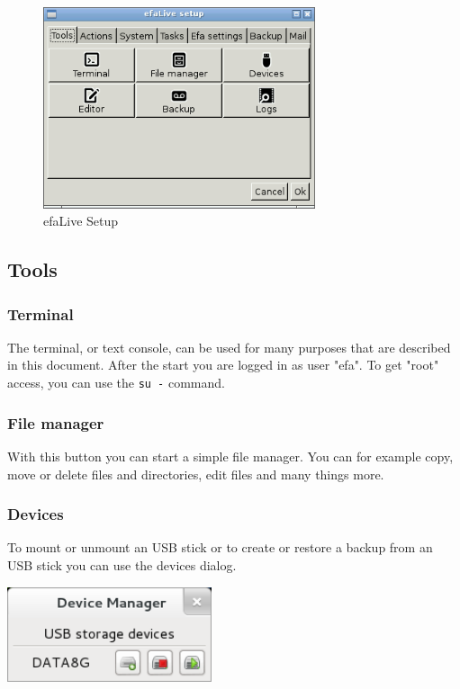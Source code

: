 \documentclass[a4paper,12pt,twoside]{article}
\begin{document}
\begin{figure}
    \centering
    \includegraphics[width=8cm]{screenshots/efalive_setup.png}
    \caption{efaLive Setup}
    \label{fig:efalivesetup}
\end{figure}


\subsection{Tools}
\label{sct:efalivesetup_tools}


\subsubsection{Terminal}
\label{sct:terminal}
The terminal, or text console, can be used for many purposes that are
described in this document. After the start you are logged in as user
"efa". To get "root" access, you can use the \texttt{su -} command.


\subsubsection{File manager}
\label{sct:file_manager}
With this button you can start a simple file manager. You can for
example copy, move or delete files and directories, edit files and many
things more.

\subsubsection{Devices}
\label{sct:dialog_devices}
To mount or unmount an USB stick or
to create or restore a backup from an USB stick you can use
the devices dialog.

\bigskip
\begin{minipage}{\linewidth}
  \centering
  \captionsetup{type=figure}
  \includegraphics[width=6cm]{screenshots/efaLiveen-img21.png}
  \label{fig:dialog_devices}
\end{minipage}
\end{document}
